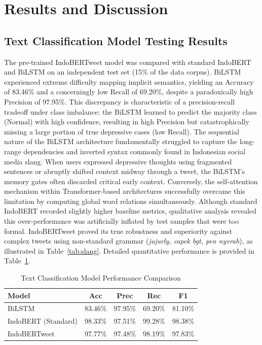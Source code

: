 \documentclass[conference]{IEEEtran}
\begin{document}
\section{Results and Discussion}

\subsection{Text Classification Model Testing Results}
The pre-trained IndoBERTweet model was compared with standard IndoBERT
and BiLSTM on an independent test set (15\% of the data corpus).
BiLSTM experienced extreme difficulty mapping implicit semantics, yielding
an Accuracy of 83.46\% and a concerningly low Recall of 69.20\%,
despite a paradoxically high Precision of 97.95\%. This discrepancy
is characteristic of a precision-recall tradeoff under class imbalance:
the BiLSTM learned to predict the majority class (Normal) with high
confidence, resulting in high Precision but catastrophically missing
a large portion of true depressive cases (low Recall). The sequential
nature of the BiLSTM architecture fundamentally struggled to capture
the long-range dependencies and inverted syntax commonly found in
Indonesian social media slang. When users expressed depressive thoughts
using fragmented sentences or abruptly shifted context midway through
a tweet, the BiLSTM's memory gates often discarded critical early
context. Conversely, the self-attention mechanism within Transformer-based
architectures successfully overcame this limitation by computing global word relations simultaneously.
Although standard IndoBERT recorded slightly higher baseline metrics, qualitative analysis
revealed this over-performance was artificially inflated by test samples that were too
formal. IndoBERTweet proved its true robustness and superiority against complex tweets using
non-standard grammar (\emph{jujurly, capek bgt, pen nyerah}),
as illustrated in Table~\ref{tab:slang}. Detailed quantitative performance is provided in
Table~\ref{tab:text}.

\begin{table}[!ht]
\caption{Text Classification Model Performance Comparison}
\begin{center}
\begin{tabular}{|l|c|c|c|c|}
\hline
\textbf{Model} & \textbf{Acc} & \textbf{Prec} & \textbf{Rec} & \textbf{F1} \\
\hline
BiLSTM               & 83.46\% & 97.95\% & 69.20\% & 81.10\% \\
IndoBERT (Standard)  & 98.33\% & 97.51\% & 99.28\% & 98.38\% \\
IndoBERTweet         & 97.77\% & 97.48\% & 98.19\% & 97.83\% \\
\hline
\end{tabular}
\label{tab:text}
\end{center}
\end{table}
\end{document}
